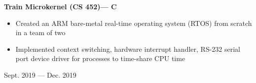 \documentclass[9pt]{extarticle}
\begin{document}
\vfill

\begin{minipage}[t]{0.80\linewidth}
\begin{flushleft}
\textbf{Train Microkernel (CS 452)--- C}
\begin{itemize}
	\item Created an ARM bare-metal real-time operating system (RTOS)
		from scratch in a team of two
    \item Implemented context switching, hardware interrupt handler, RS-232 serial port device driver
		for processes to time-share CPU time
\end{itemize}

\end{flushleft}
\end{minipage}
\hfill
\begin{minipage}[t]{0.19\linewidth}
\begin{flushright}
Sept. 2019 --- Dec. 2019
\end{flushright}
\end{minipage}




\vfill
\end{document}
